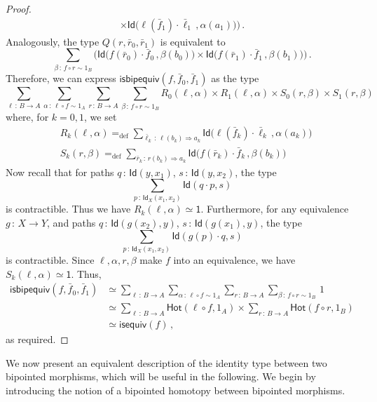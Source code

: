 \documentclass[10pt,a4paper,oneside,reqno]{amsart}
\theoremstyle{mythm}
\theoremstyle{mydef}
\theoremstyle{myrmk}
\newcommand{\defeq}{=_{\mathrm{def}}}
\newcommand{\co}{\,{:}\,}
\newcommand{\com}{\circ}
\newcommand{\ct}{\cdot}
\newcommand{\isequiv}{\mathsf{isequiv}}
\newcommand{\Hot}{\mathsf{Hot}}
\newcommand{\one}{\mathsf{1}}
\newcommand{\Id}{\mathsf{Id}}
\newcommand{\isbipequiv}{\mathsf{isbipequiv}}
\begin{document}
\begin{proof}
\begin{align*}
\times 
\Id \big( \ell(\bar{f}_1) \ct \bar{\ell}_1 \, ,  \alpha(a_1) \big) 
\Big) \, .
\end{align*}
Analogously, the type $Q(r,\bar{r}_0,\bar{r}_1)$ is equivalent to
\[
\sum_{\beta \co f \com r \sim 1_B}
\Big(
\Id  \big( f (\bar{r}_0) \ct \bar{f}_0 \, ,  \beta(b_0) \big) 
\times 
\Id \big( f(\bar{r}_1) \ct \bar{f}_1 \, ,  \beta(b_1) \big)
\Big) \, .
\]
Therefore, we can express $\isbipequiv(f, \bar{f}_0, \bar{f}_1)$ as the type
\[
\sum_{\ell \co B \to  A} 
\sum_{\alpha \co \ell \com f \sim 1_A}
\sum_{ r \co B \to A} 
\sum_{\beta \co f \com r \sim 1_B} 
	R_0(\ell,\alpha) \times R_1(\ell,\alpha) \times S_0(r,\beta) \times S_1(r,\beta)
\]
where, for $k = 0,1$, we set
\begin{align*}
& R_k(\ell,\alpha) \defeq \sum_{\bar{\ell}_k \co \ell(b_k) \Rightarrow a_k} \Id \big( \ell (\bar{f}_k) \ct \bar{\ell}_k \, ,  \alpha(a_k) \big) \\
& S_k(r,\beta) \defeq \sum_{\bar{r}_k \co r(b_k) \Rightarrow a_k} \Id \big( f (\bar{r}_k) \ct \bar{f}_k \, ,  \beta(b_k) \big) 
\end{align*}
Now recall  that for paths $q \co \Id(y,x_1)$, $s \co \Id(y,x_2)$, the type 
\[
\sum_{p \co \Id_X(x_1,x_2)} \Id(q \ct p,s)
\] 
is contractible. Thus we have $R_k(\ell,\alpha) \simeq \one$.
Furthermore, for any equivalence $g \co X \to Y$, and paths $q \co \Id(g(x_2),y)$, $s \co \Id(g(x_1),y)$, the type 
\[
\sum_{p \co \Id_X(x_1,x_2)} \Id(g(p) \ct q,s)
\] is contractible. Since $\ell, \alpha, r, \beta$ make $f$ into an equivalence, we have $S_k(\ell,\alpha) \simeq \one$. Thus,
\begin{align*} 
\isbipequiv(f,\bar{f}_0, \bar{f}_1) 
  & \simeq   \sum_{\ell \co B \to A} \sum_{\alpha \co \ell \com f \sim 1_A} \sum_{ r  \co B \to A} 
 \sum_{\beta \co f \com r \sim 1_B} \, 1 \\
 & \simeq \sum_{\ell \co B \to A}  \Hot( \ell \com f , 1_A ) \times 
\sum_{r  \co B \to A}  \Hot( f \com r, 1_B ) \\
 & \simeq \isequiv(f) \, ,
\end{align*} 
as required.
\end{proof}



We now present an equivalent description of the identity type between two bipointed morphisms, which 
will be useful in the following. We begin by introducing the notion of a bipointed homotopy between bipointed morphisms.
\end{document}
